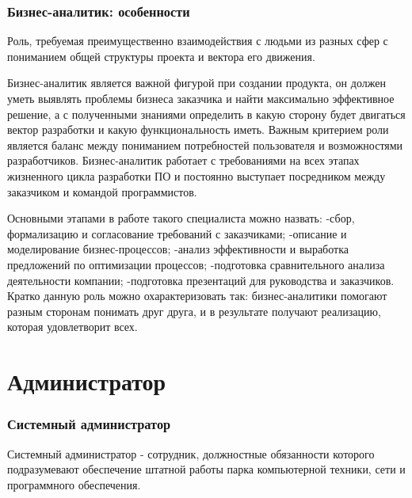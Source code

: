 \documentclass{../industrial-development}
\begin{document}
	\begin{frame} \frametitle{Бизнес-аналитик: особенности}
		Роль, требуемая преимущественно взаимодействия с людьми из разных сфер с пониманием общей структуры проекта и вектора его движения. 
	\end{frame}
	
	\lecturenotes
		 Бизнес-аналитик является важной фигурой при создании продукта, он должен уметь выявлять проблемы бизнеса заказчика и найти максимально эффективное решение, а с полученными знаниями определить в какую сторону будет двигаться вектор разработки и какую функциональность иметь. Важным критерием роли является баланс между пониманием потребностей пользователя и возможностями разработчиков. Бизнес-аналитик работает с требованиями на всех этапах жизненного цикла разработки ПО и постоянно выступает посредником между заказчиком и командой программистов. 
		 
		 Основными этапами в работе такого специалиста можно назвать: 
		 -сбор, формализацию и согласование требований с заказчиками; 
		 -описание и моделирование бизнес-процессов; 
		 -анализ эффективности и выработка предложений по оптимизации процессов; 
		 -подготовка сравнительного анализа деятельности компании; 
		 -подготовка презентаций для руководства и заказчиков. 
		 Кратко данную роль можно охарактеризовать так: бизнес-аналитики помогают разным сторонам понимать друг друга, и в результате получают реализацию, которая удовлетворит всех. 
	
	\section{Администратор} 
	
	\begin{frame} \frametitle{Системный администратор}
		\begin{block}{}
			\alert {Системный администратор} - сотрудник, должностные обязанности которого подразумевают обеспечение штатной работы парка компьютерной техники, сети и программного обеспечения.
		\end{block}
	\end{frame}
	
\end{document}
